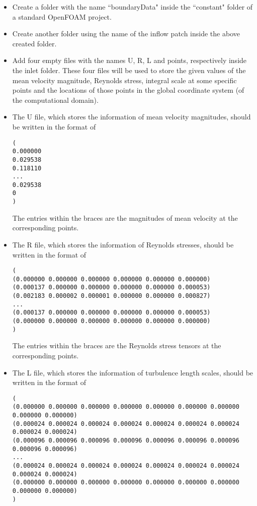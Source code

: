 \begin{itemize}

\item Create a folder with the name \textcolor{mauve}{``boundaryData"} inside the \textcolor{mauve}{``constant"} folder of a standard OpenFOAM project.

\item Create another folder using the name of the inflow patch inside the above created folder.

\item Add four empty files with the names \textcolor{mauve}{U}, \textcolor{mauve}{R}, \textcolor{mauve}{L} and \textcolor{mauve}{points}, respectively inside the \textcolor{mauve}{inlet} folder. These four files will be used to store the given values of the mean velocity magnitude, Reynolds stress, integral scale at some specific points and the locations of those points in the global coordinate system (of the computational domain).

\item The \textcolor{mauve}{U} file, which stores the information of mean velocity magnitudes, should be written in the format of

\begin{lstlisting} 
(
0.000000
0.029538
0.118110
...
0.029538
0
)
\end{lstlisting}

The entries within the braces are the magnitudes of mean velocity at the corresponding points.

\item The \textcolor{mauve}{R} file, which stores the information of Reynolds stresses, should be written in the format of

\begin{lstlisting} 
(
(0.000000 0.000000 0.000000 0.000000 0.000000 0.000000)
(0.000137 0.000000 0.000000 0.000000 0.000000 0.000053)
(0.002183 0.000002 0.000001 0.000000 0.000000 0.000827)
...
(0.000137 0.000000 0.000000 0.000000 0.000000 0.000053)
(0.000000 0.000000 0.000000 0.000000 0.000000 0.000000)
)
\end{lstlisting}

The entries within the braces are the Reynolds stress tensors at the corresponding points.

\item The \textcolor{mauve}{L} file, which stores the information of turbulence length scales, should be written in the format of

\begin{lstlisting} 
(
(0.000000 0.000000 0.000000 0.000000 0.000000 0.000000 0.000000 0.000000 0.000000)
(0.000024 0.000024 0.000024 0.000024 0.000024 0.000024 0.000024 0.000024 0.000024)
(0.000096 0.000096 0.000096 0.000096 0.000096 0.000096 0.000096 0.000096 0.000096)
...
(0.000024 0.000024 0.000024 0.000024 0.000024 0.000024 0.000024 0.000024 0.000024)
(0.000000 0.000000 0.000000 0.000000 0.000000 0.000000 0.000000 0.000000 0.000000)
)
\end{lstlisting}


\end{itemize}
